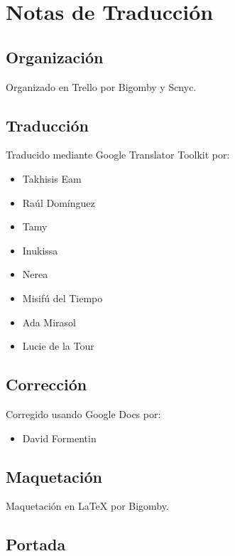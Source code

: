 \section*{Notas de Traducción}

\subsection*{Organización}\label{organizaciuxf3n}

Organizado en Trello por Bigomby y Scnyc.

\subsection*{Traducción}\label{traducciuxf3n}

Traducido mediante Google Translator Toolkit por:

\begin{itemize}
\itemsep1pt\parskip0pt
\item
  Takhisis Eam
\item
  Raúl Domínguez
\item
  Tamy
\item
  Inukissa
\item
  Nerea
\item
  Misifú del Tiempo
\item
  Ada Mirasol
\item
  Lucie de la Tour
\end{itemize}

\subsection*{Corrección}\label{correcciuxf3n}

Corregido usando Google Docs por:

\begin{itemize}
\itemsep1pt\parskip0pt
\item
  David Formentin
\end{itemize}

\subsection*{Maquetación}\label{maquetaciuxf3n}

Maquetación en LaTeX por Bigomby.

\subsection*{Portada}\label{portada}


